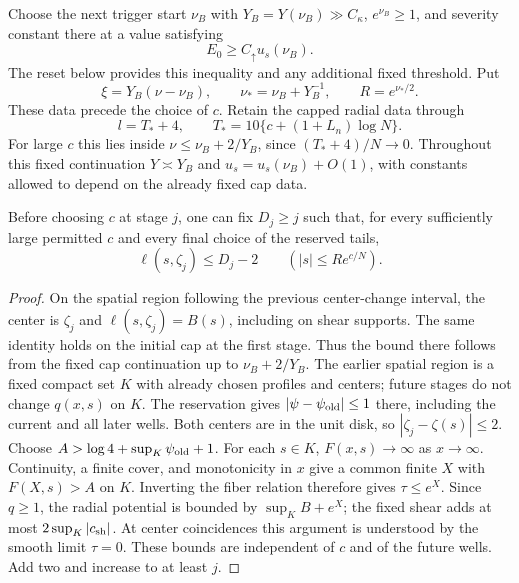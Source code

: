 Choose the next trigger start $\nu_B$ with
$Y_B=Y(\nu_B)\gg C_\kappa$, $e^{\nu_B}\geq1$, and severity constant
there at a value satisfying
\begin{equation}\label{assembly:trigger-initial}
 E_0\geq C_\uparrow u_s(\nu_B).
\end{equation}
The reset below provides this inequality and any additional fixed
threshold. Put
\begin{equation}\label{assembly:trigger-radius}
 \xi=Y_B(\nu-\nu_B),\qquad
 \nu_*=\nu_B+Y_B^{-1},\qquad R=e^{\nu_*/2}.
\end{equation}
These data precede the choice of $c$. Retain the capped radial data
through
\begin{equation}\label{assembly:post-length}
 l=T_*+4,\qquad T_*=10\{c+(1+L_n)\log N\}.
\end{equation}
For large $c$ this lies inside $\nu\leq\nu_B+2/Y_B$, since
$(T_*+4)/N\to0$. Throughout this fixed continuation
$Y\asymp Y_B$ and $u_s=u_s(\nu_B)+O(1)$, with constants allowed
to depend on the already fixed cap data.

\begin{lemma}\label{assembly:height}
Before choosing $c$ at stage $j$, one can fix $D_j\geq j$ such that,
for every sufficiently large permitted $c$ and every final choice of
the reserved tails,
\begin{equation}\label{assembly:height-bound}
 \ell(s,\zeta_j)\leq D_j-2\qquad(|s|\leq Re^{c/N}).
\end{equation}
\end{lemma}

\begin{proof}
On the spatial region following the previous center-change interval,
the center is $\zeta_j$ and $\ell(s,\zeta_j)=B(s)$, including on shear
supports. The same identity holds on the initial cap at the first
stage. Thus the bound there follows from the fixed cap continuation
up to $\nu_B+2/Y_B$.
The earlier spatial region is a fixed compact set $K$ with already
chosen profiles and centers; future stages do not change $q(x,s)$
on $K$. The reservation gives $|\psi-\psi_{\rm old}|\leq1$ there,
including the current and all later wells. Both centers are in the unit disk, so
$|\zeta_j-\zeta(s)|\leq2$. Choose
$A>\log4+\sup_K\psi_{\rm old}+1$.
For each $s\in K$, $F(x,s)\to\infty$ as $x\to\infty$.
Continuity, a finite cover, and monotonicity in $x$ give a common
finite $X$ with $F(X,s)>A$ on $K$. Inverting the fiber relation
therefore gives $\tau\leq e^X$. Since $q\geq1$, the radial potential
is bounded by $\sup_K B+e^X$; the fixed shear adds at most
$2\sup_K|c_{\rm sh}|$. At center coincidences this argument is
understood by the smooth limit $\tau=0$. These bounds are independent
of $c$ and of the future wells. Add two and increase to at least $j$.
\end{proof}

